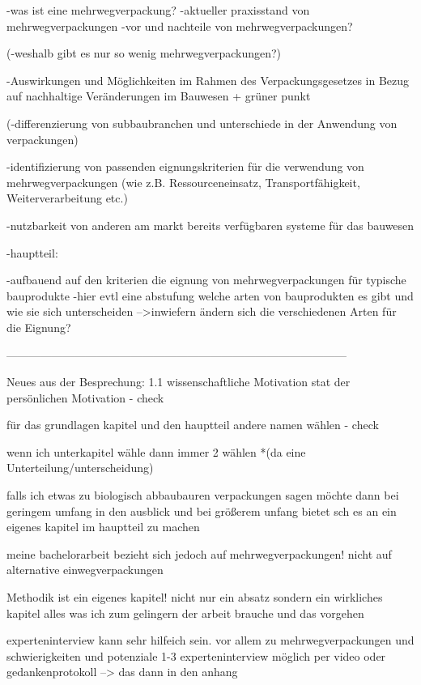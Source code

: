     -was ist eine mehrwegverpackung?
    -aktueller praxisstand von mehrwegverpackungen
    -vor und nachteile von mehrwegverpackungen?
    
    (-weshalb gibt es nur so wenig mehrwegverpackungen?)
    
    -Auswirkungen und Möglichkeiten im Rahmen des Verpackungsgesetzes in Bezug auf nachhaltige Veränderungen im Bauwesen + grüner punkt
    
    (-differenzierung von subbaubranchen und unterschiede in der Anwendung von verpackungen)
    
    
    -identifizierung von passenden eignungskriterien für die verwendung von mehrwegverpackungen 
        (wie z.B. Ressourceneinsatz, Transportfähigkeit, Weiterverarbeitung etc.)
        
          -nutzbarkeit von anderen am markt bereits verfügbaren systeme für das bauwesen
    
    -hauptteil: 
        
        -aufbauend auf den kriterien die eignung von mehrwegverpackungen für typische bauprodukte
            -hier evtl eine abstufung welche arten von bauprodukten es gibt und wie sie sich unterscheiden
                -->inwiefern ändern sich die verschiedenen Arten für die Eignung? 
        
        
------------------------------------------------------------------------------------------        

Neues aus der Besprechung:
    1.1 wissenschaftliche Motivation stat der persönlichen Motivation - check
    
    für das grundlagen kapitel und den hauptteil  andere namen wählen - check
    
    wenn ich unterkapitel wähle dann immer 2 wählen *(da eine Unterteilung/unterscheidung)
    
    falls ich etwas zu biologisch abbaubauren verpackungen sagen möchte dann bei geringem umfang in den ausblick und bei größerem unfang bietet sch es an ein eigenes kapitel im hauptteil zu machen
    
    meine bachelorarbeit bezieht sich jedoch auf mehrwegverpackungen! nicht auf alternative einwegverpackungen
    
    Methodik ist ein eigenes kapitel!
    nicht nur ein absatz sondern ein wirkliches kapitel
    alles was ich zum gelingern der arbeit brauche und das vorgehen
    
    experteninterview kann sehr hilfeich sein. vor allem zu mehrwegverpackungen
    und schwierigkeiten und potenziale 
    1-3 experteninterview
    möglich per video
    oder gedankenprotokoll --> das dann in den anhang
    

